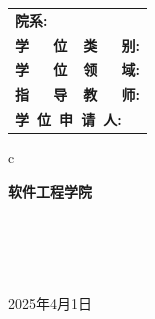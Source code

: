 \vskip 1.0cm

\begin{center}
	\renewcommand\arraystretch{1.5}
	\begin{tabular}{l}
		{\sihao \bf 院\qquad\qquad 系:} \\
		{\sihao \bf 学~~~位~~类~~~别:}      \\
		{\sihao \bf 学~~~位~~领~~~域:}      \\
		{\sihao \bf 指~~~导~~教~~~师:}      \\
		{\sihao \bf 学~位~申~请~人:}
	\end{tabular}
	\begin{tabular}c

		{\sihao \bf  \qquad 软件工程学院 \qquad} \\
		                  \\
		                 \\
		                     \\
		                     \\


		\hline
	\end{tabular}
\end{center}

\vskip 2.0cm

\begin{center}
	{\sihao 2025年4月1日}
\end{center}

\cleardoublepage